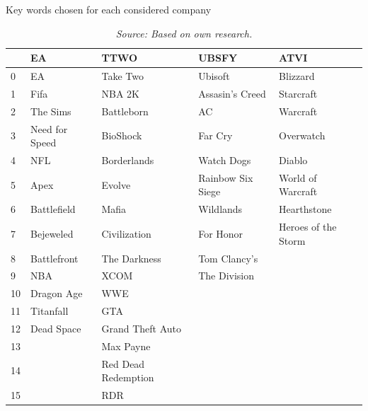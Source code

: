 \documentclass[review]{elsarticle} %
\begin{document}
\begin{table}[hbt!]
\centering
\caption{Key words chosen for each considered company}
\begin{tabular}{lllll}
\toprule
{} &              EA &                 TTWO &              UBSFY &                 ATVI \\
\midrule
0  &              EA &             Take Two &            Ubisoft &             Blizzard \\
1  &            Fifa &               NBA 2K &    Assasin's Creed &            Starcraft \\
2  &        The Sims &           Battleborn &                 AC &             Warcraft \\
3  &  Need for Speed &             BioShock &            Far Cry &            Overwatch \\
4  &             NFL &          Borderlands &         Watch Dogs &               Diablo \\
5  &            Apex &               Evolve &  Rainbow Six Siege &    World of Warcraft \\
6  &     Battlefield &                Mafia &          Wildlands &          Hearthstone \\
7  &       Bejeweled &         Civilization &          For Honor &  Heroes of the Storm \\
8  &     Battlefront &         The Darkness &       Tom Clancy's &                  \\
9  &             NBA &                 XCOM &       The Division &                  \\
10 &      Dragon Age &                  WWE &                &                  \\
11 &       Titanfall &                  GTA &                &                  \\
12 &      Dead Space &     Grand Theft Auto &                &                  \\
13 &             &            Max Payne &                &                  \\
14 &             &  Red Dead Redemption &                &                  \\
15 &             &                  RDR &                &                  \\
\bottomrule
\end{tabular}
\caption*{\textit{Source: Based on own research.}}
\end{table}
\end{document}
